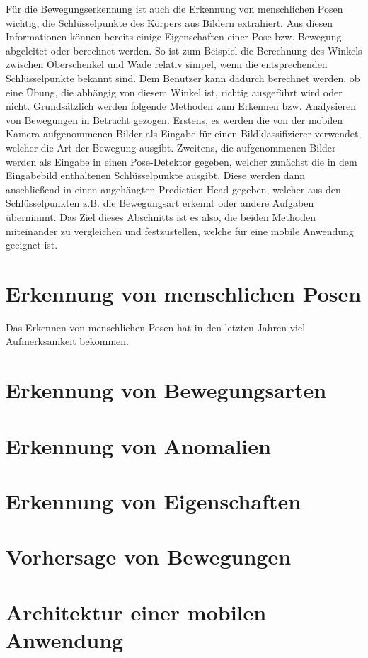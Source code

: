 Für die Bewegungserkennung ist auch die Erkennung von menschlichen Posen
wichtig, die Schlüsselpunkte des Körpers aus Bildern extrahiert. Aus diesen
Informationen können bereits einige Eigenschaften einer Pose bzw. Bewegung
abgeleitet oder berechnet werden. So ist zum Beispiel die Berechnung des Winkels
zwischen Oberschenkel und Wade relativ simpel, wenn die entsprechenden
Schlüsselpunkte bekannt sind. Dem Benutzer kann dadurch berechnet werden, ob
eine Übung, die abhängig von diesem Winkel ist, richtig ausgeführt wird oder
nicht. Grundsätzlich werden folgende Methoden zum Erkennen bzw. Analysieren von
Bewegungen in Betracht gezogen. Erstens, es werden die von der mobilen Kamera
aufgenommenen Bilder als Eingabe für einen Bildklassifizierer verwendet, welcher
die Art der Bewegung ausgibt. Zweitens, die aufgenommenen Bilder werden als
Eingabe in einen Pose-Detektor gegeben, welcher zunächst die in dem Eingabebild
enthaltenen Schlüsselpunkte ausgibt. Diese werden dann anschließend in einen
angehängten Prediction-Head gegeben, welcher aus den Schlüsselpunkten z.B. die
Bewegungsart erkennt oder andere Aufgaben übernimmt. Das Ziel dieses Abschnitts
ist es also, die beiden Methoden miteinander zu vergleichen und festzustellen,
welche für eine mobile Anwendung geeignet ist.

\section{Erkennung von menschlichen Posen}
Das Erkennen von menschlichen Posen hat in den letzten Jahren viel Aufmerksamkeit bekommen.

\section{Erkennung von Bewegungsarten}
\section{Erkennung von Anomalien}
\section{Erkennung von Eigenschaften}
\section{Vorhersage von Bewegungen}
\section{Architektur einer mobilen Anwendung}